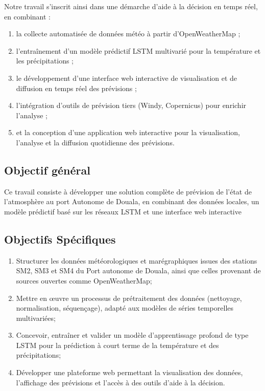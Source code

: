 \documentclass[a4paper,12pt,openany]{report}
\begin{document}
	\medskip
	
	Notre travail s’inscrit ainsi dans une démarche d’aide à la décision en temps réel, en combinant :
	\begin{enumerate}
		\item la collecte automatisée de données météo à partir d'OpenWeatherMap ;
		\item l’entraînement d’un modèle prédictif LSTM multivarié pour la température et les précipitations ;
		\item le développement d’une interface web interactive de visualisation et de diffusion en temps réel des prévisions ;
		\item l’intégration d’outils de prévision tiers (Windy, Copernicus) pour enrichir l’analyse ;
		\item et la conception d’une application web interactive pour la visualisation, l’analyse et la diffusion quotidienne des prévisions.
	\end{enumerate}
	
 
	
\subsection{Objectif général}
	\quad 	Ce travail consiste à développer une solution complète de prévision  de l'état de l'atmosphère au   port Autonome de Douala, en combinant des données locales, un modèle prédictif basé sur les réseaux LSTM et une interface web interactive\\

	
\subsection{Objectifs Spécifiques}
	
\begin{enumerate}
	\item Structurer les données météorologiques et marégraphiques issues des stations SM2, SM3 et SM4 du Port autonome de Douala, ainsi que celles provenant de sources ouvertes comme OpenWeatherMap;
	
	\item Mettre en œuvre un processus de prétraitement des données (nettoyage, normalisation, séquençage), adapté aux modèles de séries temporelles multivariées;
	
	\item Concevoir, entraîner et valider un modèle d’apprentissage profond de type LSTM pour la prédiction à court terme de la température et des précipitations;
	
	\item Développer une plateforme web permettant la visualisation des données, l’affichage des prévisions et l’accès à des outils d’aide à la décision.
\end{enumerate}
	\quad
	
\end{document}
